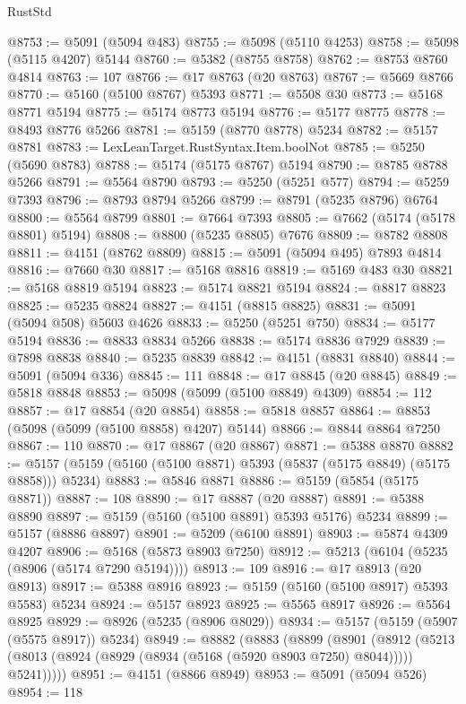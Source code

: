 \begin{lexlean}{RustStd}
\begin{coremodule}
@8753 := @5091 (@5094 @483)
@8755 := @5098 (@5110 @4253)
@8758 := @5098 (@5115 @4207) @5144
@8760 := @5382 (@8755 @8758)
@8762 := @8753 @8760 @4814
@8763 := 107
@8766 := @17 @8763 (@20 @8763)
@8767 := @5669 @8766
@8770 := @5160 (@5100 @8767) @5393
@8771 := @5508 @30
@8773 := @5168 @8771 @5194
@8775 := @5174 @8773 @5194
@8776 := @5177 @8775
@8778 := @8493 @8776 @5266
@8781 := @5159 (@8770 @8778) @5234
@8782 := @5157 @8781
@8783 := LexLeanTarget.RustSyntax.Item.boolNot
@8785 := @5250 (@5690 @8783)
@8788 := @5174 (@5175 @8767) @5194
@8790 := @8785 @8788 @5266
@8791 := @5564 @8790
@8793 := @5250 (@5251 @577)
@8794 := @5259 @7393
@8796 := @8793 @8794 @5266
@8799 := @8791 (@5235 @8796) @6764
@8800 := @5564 @8799
@8801 := @7664 @7393
@8805 := @7662 (@5174 (@5178 @8801) @5194)
@8808 := @8800 (@5235 @8805) @7676
@8809 := @8782 @8808
@8811 := @4151 (@8762 @8809)
@8815 := @5091 (@5094 @495) @7893 @4814
@8816 := @7660 @30
@8817 := @5168 @8816
@8819 := @5169 @483 @30
@8821 := @5168 @8819 @5194
@8823 := @5174 @8821 @5194
@8824 := @8817 @8823
@8825 := @5235 @8824
@8827 := @4151 (@8815 @8825)
@8831 := @5091 (@5094 @508) @5603 @4626
@8833 := @5250 (@5251 @750)
@8834 := @5177 @5194
@8836 := @8833 @8834 @5266
@8838 := @5174 @8836 @7929
@8839 := @7898 @8838
@8840 := @5235 @8839
@8842 := @4151 (@8831 @8840)
@8844 := @5091 (@5094 @336)
@8845 := 111
@8848 := @17 @8845 (@20 @8845)
@8849 := @5818 @8848
@8853 := @5098 (@5099 (@5100 @8849) @4309)
@8854 := 112
@8857 := @17 @8854 (@20 @8854)
@8858 := @5818 @8857
@8864 := @8853 (@5098 (@5099 (@5100 @8858) @4207) @5144)
@8866 := @8844 @8864 @7250
@8867 := 110
@8870 := @17 @8867 (@20 @8867)
@8871 := @5388 @8870
@8882 := @5157 (@5159 (@5160 (@5100 @8871) @5393 (@5837 (@5175 @8849) (@5175 @8858))) @5234)
@8883 := @5846 @8871
@8886 := @5159 (@5854 (@5175 @8871))
@8887 := 108
@8890 := @17 @8887 (@20 @8887)
@8891 := @5388 @8890
@8897 := @5159 (@5160 (@5100 @8891) @5393 @5176) @5234
@8899 := @5157 (@8886 @8897)
@8901 := @5209 (@6100 @8891)
@8903 := @5874 @4309 @4207
@8906 := @5168 (@5873 @8903 @7250)
@8912 := @5213 (@6104 (@5235 (@8906 (@5174 @7290 @5194))))
@8913 := 109
@8916 := @17 @8913 (@20 @8913)
@8917 := @5388 @8916
@8923 := @5159 (@5160 (@5100 @8917) @5393 @5583) @5234
@8924 := @5157 @8923
@8925 := @5565 @8917
@8926 := @5564 @8925
@8929 := @8926 (@5235 (@8906 @8029))
@8934 := @5157 (@5159 (@5907 (@5575 @8917)) @5234)
@8949 := @8882
    (@8883
      (@8899
        (@8901
          (@8912 (@5213 (@8013 (@8924 (@8929 (@8934 (@5168 (@5920 @8903 @7250) @8044))))) @5241)))))
@8951 := @4151 (@8866 @8949)
@8953 := @5091 (@5094 @526)
@8954 := 118

\end{coremodule}
\end{lexlean}
